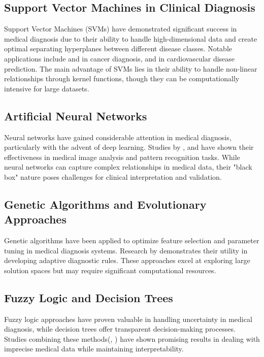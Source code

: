 \documentclass[3p,times,procedia]{elsarticle}
\begin{document}
\subsection{Support Vector Machines in Clinical Diagnosis}
Support Vector Machines (SVMs) have demonstrated significant
success in medical diagnosis due to their ability to handle
high-dimensional data and create optimal separating 
hyperplanes between different disease classes. Notable
applications include \cite{CHEN20119014} and \cite{ALAM2018} in 
cancer diagnosis, \cite{Sali2016Clinical} and \cite{COMAK200721}
in cardiovascular disease prediction. The main advantage
of SVMs lies in their
ability to handle non-linear relationships through kernel
functions, though they can be computationally intensive
for large datasets.

\subsection{Artificial Neural Networks}
Neural networks have gained considerable attention in medical
diagnosis, particularly with the advent of deep learning.
Studies by \cite{Karabulut2012Effective},
\cite{Uguz2012Biomedical} and \cite{Tate2006Development} 
have shown their effectiveness in
medical image analysis and pattern recognition tasks. 
While neural networks can capture complex relationships 
in medical data, their "black box" nature poses challenges
for clinical interpretation and validation.

\subsection{Genetic Algorithms and Evolutionary Approaches}
Genetic algorithms have been applied to optimize feature
selection and parameter tuning in medical diagnosis systems.
Research by \cite{Rani2021Decision} demonstrates their utility in
developing adaptive diagnostic rules. These approaches excel
at exploring large solution spaces but may require significant
computational resources.

\subsection{Fuzzy Logic and Decision Trees}
Fuzzy logic approaches have proven valuable in handling
uncertainty in medical diagnosis, while decision trees
offer transparent decision-making processes. Studies 
combining these methods(\cite{FAN2011632},
\cite{Barach2019Fuzzy}) have shown
promising results in dealing with imprecise medical data
while maintaining interpretability.
\end{document}
